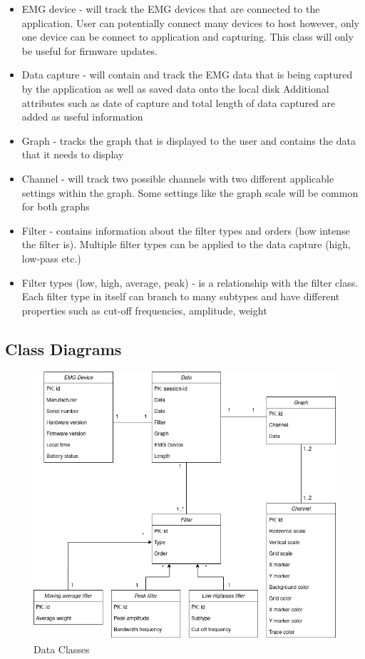 \documentclass[12pt,a4paper]{article}
\begin{document}
\begin{itemize}
	\item EMG device - will track the EMG devices that are connected to the application. User can potentially connect many devices to host however, only one device can be connect to application and capturing.
						This class will only be useful for firmware updates. 
	\item Data capture - will contain and track the EMG data that is being captured by the application as well as saved data onto the local disk 
						Additional attributes such as date of capture and total length of data captured are added as useful information
	\item Graph - tracks the graph that is displayed to the user and contains the data that it needs to display
	\item Channel - will track two possible channels  with two different applicable settings within the graph. Some settings like the graph scale will be common for both graphs
	\item Filter - contains information about the filter types and orders (how intense the filter is). Multiple filter types can be applied to the data capture (high, low-pass etc.)
	\item Filter types (low, high, average, peak) - is a relationship with the filter class. Each filter type in itself can branch to many subtypes and have different properties such as cut-off frequencies, amplitude, weight
\end{itemize}

\newpage

\subsection{Class Diagrams}

\begin{figure}[h]
	\centering
	\includegraphics[scale=0.50]{Project Data Classes.png}
	\caption{Data Classes}
	\label{Data Classes}
\end{figure}
\end{document}
